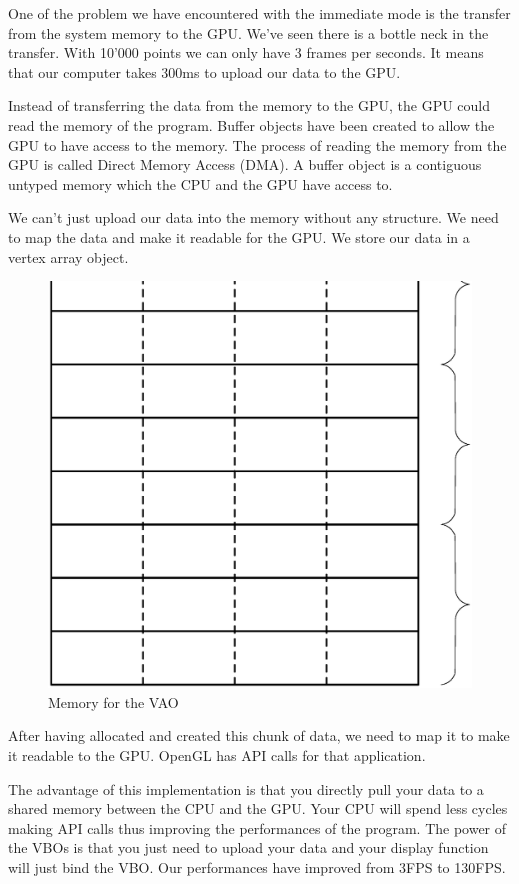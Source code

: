 One of the problem we have encountered with the immediate mode is the transfer from the system memory to the GPU.  We've seen there is a bottle neck in the transfer. With 10'000 points we can only have 3 frames per seconds. It means that our computer takes 300ms to upload our data to the GPU.

Instead of transferring the data from the memory to the GPU, the GPU could read the memory of the program. Buffer objects have been created to allow the GPU to have access to the memory. The process of reading the memory from the GPU is called Direct Memory Access (DMA). A buffer object is a contiguous untyped memory which the CPU and the GPU have access to.

We can't just upload our data into the memory without any structure. We need to map the data and make it readable for the GPU. We store our data in a vertex array object.

\begin{figure}[H]
  \centering
  \includegraphics[scale=0.2]{images/memory.eps}
    \caption{Memory for the VAO}
  \label{memoryVAO}
\end{figure}


After having allocated and created this chunk of data, we need to map it to make it readable to the GPU. OpenGL has API calls for that application.

The advantage of this implementation is that you directly pull your data to a shared memory between the CPU and the GPU. Your CPU will spend less cycles making API calls thus improving the performances of the program. The power of the VBOs is that you just need to upload your data and your display function will just bind the VBO. Our performances have improved from 3FPS to 130FPS.

